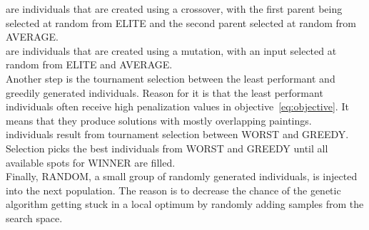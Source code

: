  are individuals that are created using a crossover, with the first parent being selected
at random from ELITE and the second parent selected at random from AVERAGE.\\

 are individuals that are created using a mutation,
with an input selected at random from ELITE and AVERAGE.\\

Another step is the tournament selection between the least performant and greedily generated individuals.
Reason for it is that the least performant individuals often receive high penalization
values in objective~\ref{eq:objective}.
It means that they produce solutions with mostly overlapping paintings.
\\

 individuals result from tournament selection between WORST and GREEDY.
Selection picks the best individuals from WORST and GREEDY until all available spots for WINNER are filled. \\

Finally, RANDOM, a small group of randomly generated individuals, is injected into the next population.
The reason is to decrease the chance of the genetic algorithm getting stuck in a local optimum
by randomly adding samples from the search space.

